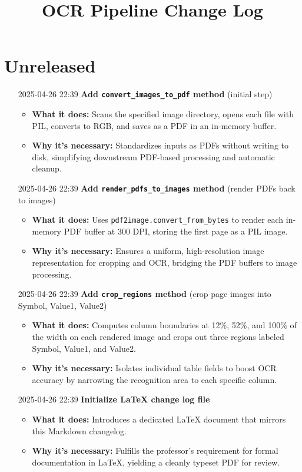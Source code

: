 \documentclass{article}
\title{OCR Pipeline Change Log}
\date{}
\begin{document}
\maketitle

\section*{Unreleased}
\begin{itemize}
  \item[2025-04-26 22:39] \textbf{Add \texttt{convert\_images\_to\_pdf} method} (initial step)  %
  \begin{itemize}
    \item \textbf{What it does:} Scans the specified image directory, opens each file with PIL, converts to RGB, and saves as a PDF in an in-memory buffer.
    \item \textbf{Why it’s necessary:} Standardizes inputs as PDFs without writing to disk, simplifying downstream PDF-based processing and automatic cleanup.
  \end{itemize}

  \item[2025-04-26 22:39] \textbf{Add \texttt{render\_pdfs\_to\_images} method} (render PDFs back to images)  %
  \begin{itemize}
    \item \textbf{What it does:} Uses \texttt{pdf2image.convert\_from\_bytes} to render each in-memory PDF buffer at 300 DPI, storing the first page as a PIL image.
    \item \textbf{Why it’s necessary:} Ensures a uniform, high-resolution image representation for cropping and OCR, bridging the PDF buffers to image processing.
  \end{itemize}

  \item[2025-04-26 22:39] \textbf{Add \texttt{crop\_regions} method} (crop page images into Symbol, Value1, Value2)  %
  \begin{itemize}
    \item \textbf{What it does:} Computes column boundaries at 12\%, 52\%, and 100\% of the width on each rendered image and crops out three regions labeled Symbol, Value1, and Value2.
    \item \textbf{Why it’s necessary:} Isolates individual table fields to boost OCR accuracy by narrowing the recognition area to each specific column.
  \end{itemize}

  \item[2025-04-26 22:39] \textbf{Initialize LaTeX change log file}  %
  \begin{itemize}
    \item \textbf{What it does:} Introduces a dedicated LaTeX document that mirrors this Markdown changelog.
    \item \textbf{Why it’s necessary:} Fulfills the professor’s requirement for formal documentation in LaTeX, yielding a cleanly typeset PDF for review.
  \end{itemize}
\end{itemize}
\end{document}
